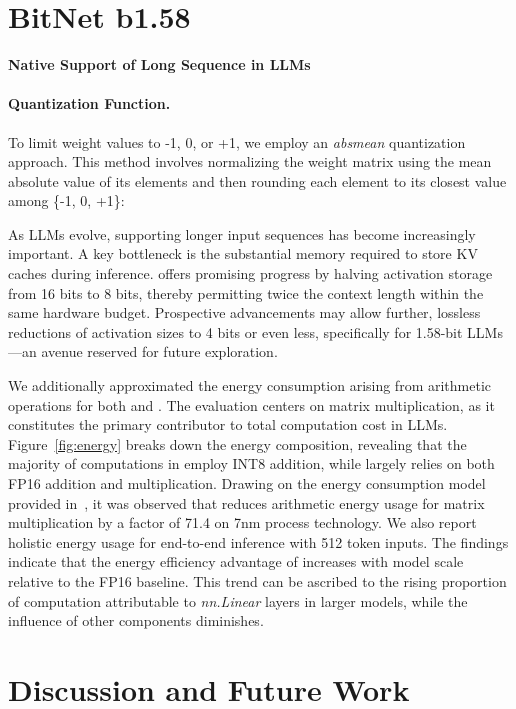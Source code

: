 \section{BitNet b1.58}

\textbf{Native Support of Long Sequence in LLMs}

\paragraph{Quantization Function.} To limit weight values to -1, 0, or +1, we employ an \emph{absmean} quantization approach. This method involves normalizing the weight matrix using the mean absolute value of its elements and then rounding each element to its closest value among \{-1, 0, +1\}:

As LLMs evolve, supporting longer input sequences has become increasingly important. A key bottleneck is the substantial memory required to store KV caches during inference.  offers promising progress by halving activation storage from 16 bits to 8 bits, thereby permitting twice the context length within the same hardware budget. Prospective advancements may allow further, lossless reductions of activation sizes to 4 bits or even less, specifically for 1.58-bit LLMs—an avenue reserved for future exploration.

We additionally approximated the energy consumption arising from arithmetic operations for both  and . The evaluation centers on matrix multiplication, as it constitutes the primary contributor to total computation cost in LLMs. Figure~\ref{fig:energy} breaks down the energy composition, revealing that the majority of computations in  employ INT8 addition, while  largely relies on both FP16 addition and multiplication. Drawing on the energy consumption model provided in~\cite{energycost, pokebnn}, it was observed that  reduces arithmetic energy usage for matrix multiplication by a factor of 71.4 on 7nm process technology. We also report holistic energy usage for end-to-end inference with 512 token inputs. The findings indicate that the energy efficiency advantage of  increases with model scale relative to the FP16  baseline. This trend can be ascribed to the rising proportion of computation attributable to \emph{nn.Linear} layers in larger models, while the influence of other components diminishes.

\section{Discussion and Future Work}

